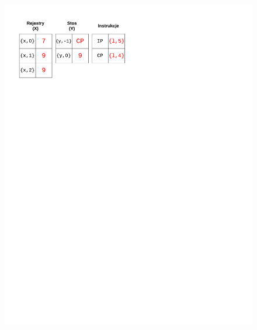 \begin{figure}
\begin{multicols}{2}
\vspace{-4mm}
\begin{Figure}
 \centering
 \includegraphics[scale=0.65, clip, trim=10mm 215mm 110mm 10mm]{interpreter_max_6}
\label{fig:max6}
\end{Figure}


\end{multicols}
\end{figure}
